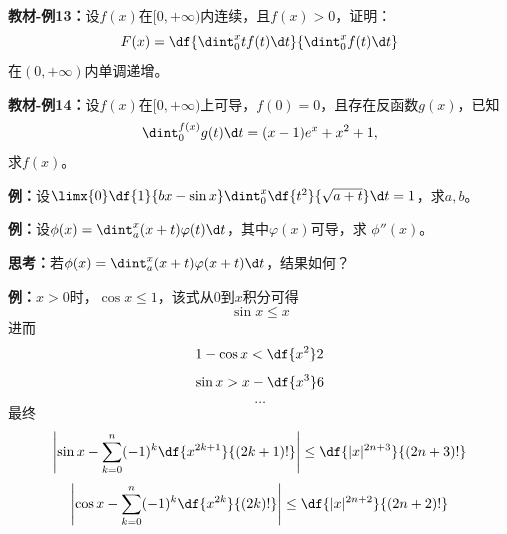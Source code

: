 {\bf 教材-例13：}设$f(x)$在$[0,+\infty)$内连续，且$f(x)>0$，证明：
$$F(x)=\df{\dint_0^xtf(t)\d t}{\dint_0^xf(t)\d t}$$
在$(0,+\infty)$内单调递增。

{\bf 教材-例14：}设$f(x)$在$[0,+\infty)$上可导，$f(0)=0$，且存在反函数$g(x)$，已知
$$\dint_0^{f(x)}g(t)\d t=(x-1)e^x+x^2+1,$$
求$f(x)$。

{\bf 例：}设$\limx{0}\df{1}{bx-\sin
x}\dint_0^x\df{t^2}{\sqrt{a+t}}\d t=1$，求$a,b$。

{\bf 例：}设$\phi(x)=\dint_a^x(x+t)\varphi(t)\d t$，其中$\varphi(x)$可导，求
$\phi''(x)$。

{\bf 思考：}若$\phi(x)=\dint_a^x(x+t)\varphi(x+t)\d t$，结果如何？

{\bf 例：}$x>0$时，$\cos x\leq 1$，该式从$0$到$x$积分可得
$$\sin x\leq x$$
进而
$$1-\cos x<\df{x^2}2$$
$$\sin x>x-\df{x^3}6$$
$$\ldots$$
最终
$$\left|\sin x-\sum\limits_{k=0}^n(-1)^k\df{x^{2k+1}}{(2k+1)!}\right|
\leq\df{|x|^{2n+3}}{(2n+3)!}$$
$$\left|\cos x-\sum\limits_{k=0}^n(-1)^k\df{x^{2k}}{(2k)!}\right|
\leq\df{|x|^{2n+2}}{(2n+2)!}$$

